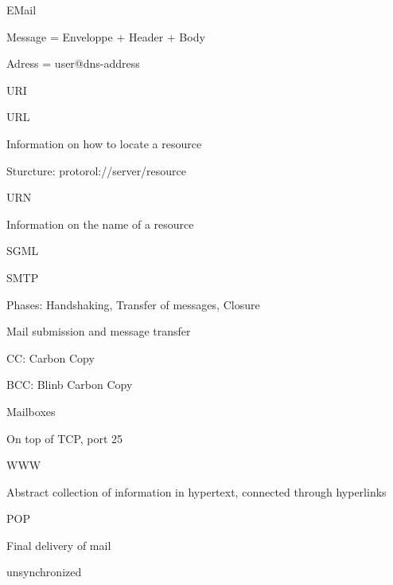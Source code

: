 \documentclass[main.tex]{subfiles}
\begin{document}
\begin{card}{EMail}
\item Message = Enveloppe + Header + Body
\item Adress = user@dns-address
\end{card}


\begin{card}{URI}
\TODO
\end{card}


\begin{card}{URL}
\item Information on how to locate a resource
\item Sturcture: protorol://server/resource
\end{card}


\begin{card}{URN}
\item Information on the name of a resource
\end{card}


\begin{card}{SGML}
\item 
\end{card}


\begin{card}{SMTP}
\item Phases: Handshaking, Transfer  of  messages, Closure
\item Mail submission and message transfer
\item CC: Carbon Copy
\item BCC: Blinb Carbon Copy
\item Mailboxes
\item On top of TCP, port 25
\end{card}



\begin{card}{WWW}
\item Abstract collection of information in hypertext, connected through hyperlinks
\end{card}


\begin{card}{POP}
\item Final delivery of mail
\item unsynchronized
\end{card}
\end{document}
